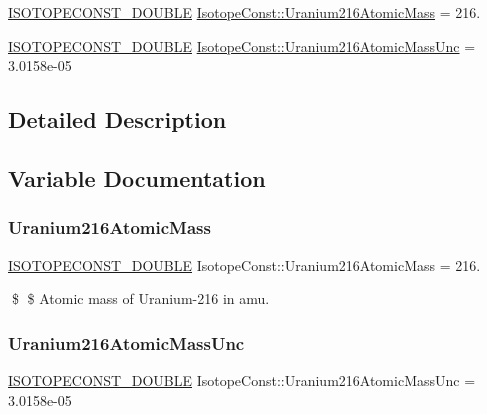 \begin{DoxyCompactItemize}
\item 
\mbox{\hyperlink{group___isotope_const-_macros_ga8f45a7272ce02c0b4c65c44636ed719a}{I\+S\+O\+T\+O\+P\+E\+C\+O\+N\+S\+T\+\_\+\+D\+O\+U\+B\+LE}} \mbox{\hyperlink{group___isotope_const-_uranium-_u216_ga1539543cd19594338c5ad1e8901f51af}{Isotope\+Const\+::\+Uranium216\+Atomic\+Mass}} = 216.
\item 
\mbox{\hyperlink{group___isotope_const-_macros_ga8f45a7272ce02c0b4c65c44636ed719a}{I\+S\+O\+T\+O\+P\+E\+C\+O\+N\+S\+T\+\_\+\+D\+O\+U\+B\+LE}} \mbox{\hyperlink{group___isotope_const-_uranium-_u216_gaed8406e84b88c84c9921578d9afe6e40}{Isotope\+Const\+::\+Uranium216\+Atomic\+Mass\+Unc}} = 3.\+0158e-\/05
\end{DoxyCompactItemize}


\subsection{Detailed Description}


\subsection{Variable Documentation}
\mbox{\label{group___isotope_const-_uranium-_u216_ga1539543cd19594338c5ad1e8901f51af}} 
\subsubsection{\texorpdfstring{Uranium216\+Atomic\+Mass}{Uranium216AtomicMass}}
{\footnotesize\ttfamily \mbox{\hyperlink{group___isotope_const-_macros_ga8f45a7272ce02c0b4c65c44636ed719a}{I\+S\+O\+T\+O\+P\+E\+C\+O\+N\+S\+T\+\_\+\+D\+O\+U\+B\+LE}} Isotope\+Const\+::\+Uranium216\+Atomic\+Mass = 216.}

\$ \$ Atomic mass of Uranium-\/216 in amu. \mbox{\label{group___isotope_const-_uranium-_u216_gaed8406e84b88c84c9921578d9afe6e40}} 
\subsubsection{\texorpdfstring{Uranium216\+Atomic\+Mass\+Unc}{Uranium216AtomicMassUnc}}
{\footnotesize\ttfamily \mbox{\hyperlink{group___isotope_const-_macros_ga8f45a7272ce02c0b4c65c44636ed719a}{I\+S\+O\+T\+O\+P\+E\+C\+O\+N\+S\+T\+\_\+\+D\+O\+U\+B\+LE}} Isotope\+Const\+::\+Uranium216\+Atomic\+Mass\+Unc = 3.\+0158e-\/05}

